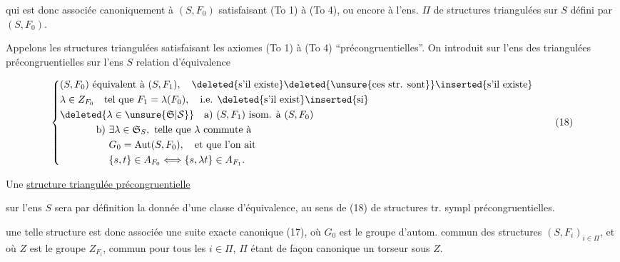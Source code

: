 qui est donc associée canoniquement à $(S,F_0)$ satisfaisant (To 1) à (To 4), ou encore à l'ens. $\Pi$ de structures triangulées sur $S$ défini par  $(S,F_0)$.

Appelons les structures triangulées satisfaisant les axiomes (To 1) à (To 4) ``précongruentielles''. On introduit sur l'ens des  triangulées précongruentielles sur l'ens $S$  relation d'équivalence

\[
\left\{\begin{aligned}
&(S,F_0)\ \text{équivalent à }(S,F_1),\quad\deleted{\text{s'il existe}}\deleted{\text{\unsure{ces str. sont}}}\inserted{\text{s'il existe}}\\
&\lambda\in Z_{F_0}\quad\text{tel que } F_1=\lambda(F_0),\quad\text{i.e. }\deleted{\text{s'il exist}}\inserted{\text{si}}\\
&\deleted{\lambda\in\unsure{\mathfrak S|\mathcal S}}\quad\mathrm a)\ (S,F_1)\ \text{isom. à }(S,F_0)\\
&\hphantom{\lambda\in\mathfrak S\quad}\mathrm b)\ \exists\lambda\in\mathfrak S_S,\ \text{telle que }\lambda\text{ commute à}\\
&\hphantom{\lambda\in\mathfrak S\quad\mathrm b)\ }G_0=\mathrm{Aut}(S,F_0),\quad\text{et que l'on ait}\\
&\hphantom{\lambda\in\mathfrak S\quad\mathrm b)\ }\{s,t\}\in A_{F_0}\Longleftrightarrow\{s,\lambda t\}\in A_{F_1}.
\end{aligned}\right.\tag*{(18)}
\]

 Une \uline{structure triangulée précongruentielle}


sur l'ens $S$ sera par définition la donnée d'une classe d'équivalence\inserted{ $\Pi$}, au sens de (18) de structures tr. sympl précongruentielles.


 une telle structure est donc associée une suite exacte canonique (17), où $G_0$ est le groupe d'autom. commun des structures $(S,F_i)_{i\in\Pi}$, et où $Z$ est le groupe $Z_{F_i}$, commun pour tous les $i\in\Pi$, $\Pi$ étant de façon canonique un torseur sous $Z$.

